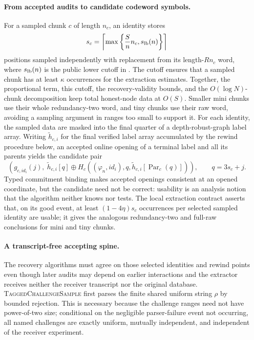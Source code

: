 \documentclass[11pt]{article}
\begin{document}
\paragraph{From accepted audits to candidate codeword symbols.}
For a sampled chunk $c$ of length $n_c$, an identity stores
\[
 s_c=\left\lceil\max\left\{\frac Sn n_c,s_{\rm lb}(n)\right\}\right\rceil
\]
positions sampled independently with replacement from its length-$Rn_c$ word,
where
$s_{\rm lb}(n)$ is the public lower cutoff in
.  The cutoff ensures that a sampled chunk has at
least $\kappa$ occurrences for the extraction estimates.  Together, the
proportional term, this cutoff, the recovery-validity bounds, and the
$O(\log N)$-chunk decomposition keep total honest-node data at $O(S)$.
Smaller mini chunks use their whole redundancy-two word, and tiny chunks use
their raw word, avoiding a sampling argument in ranges too small to support
it.  For each identity, the sampled data are masked into the final quarter of
a depth-robust-graph label array.  Writing $\widetilde h_{c,i}$ for the final
verified label array accumulated by the rewind procedure below, an accepted
online opening of a terminal label and all its parents yields the candidate
pair
\[
 \left(g_{c,\mathit{id}_i}(j),\;
 \widetilde h_{c,i}[q]\mathbin\oplus
 H_c((\varphi_n,\mathit{id}_i),q,
       \widetilde h_{c,i}[\operatorname{Par}_c(q)])\right),
 \qquad q=3s_c+j.
\]
Typed commitment binding makes accepted openings consistent at an opened
coordinate, but the candidate need not be correct: usability is an analysis
notion that the algorithm neither knows nor tests.  The local extraction
contract asserts that, on its good event, at least $(1-4\eta)s_c$ occurrences
per selected sampled identity are usable; it gives the analogous
redundancy-two and full-raw conclusions for mini and tiny chunks.

\paragraph{A transcript-free accepting spine.}
The recovery algorithms must agree on those selected identities and rewind
points even though later audits may depend on earlier interactions and the
extractor receives neither the receiver transcript nor the original database.
\textsc{TaggedChallengeSample} first parses the finite shared uniform string
$\rho$ by bounded rejection.  This is necessary because the challenge ranges
need not have power-of-two size; conditional on the negligible parser-failure
event not occurring, all named challenges are exactly uniform, mutually
independent, and independent of the receiver experiment.
\end{document}

